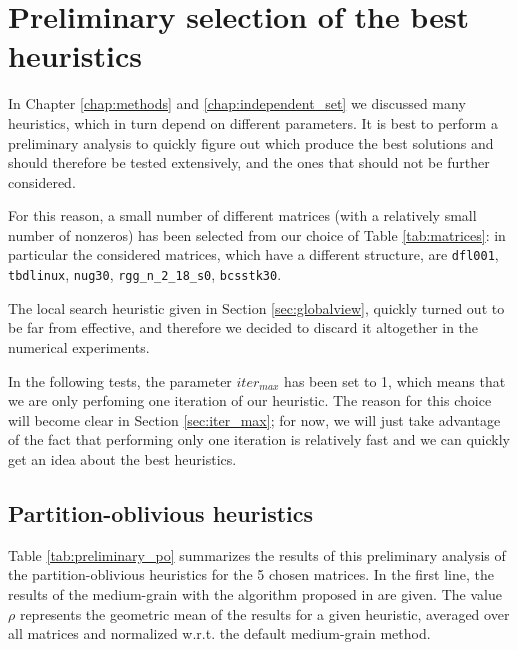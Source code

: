 \section{Preliminary selection of the best heuristics} \label{sec:preliminary_tests}

In Chapter \ref{chap:methods} and \ref{chap:independent_set} we discussed many heuristics, which in turn depend on different parameters. It is best to perform a preliminary analysis to quickly figure out which produce the best solutions and should therefore be tested extensively, and the ones that should not be further considered.

For this reason, a small number of different matrices (with a relatively small number of nonzeros) has been selected from our choice of Table \ref{tab:matrices}: in particular the considered matrices, which have a different structure, are \verb|dfl001|, \verb|tbdlinux|, \verb|nug30|, \verb|rgg_n_2_18_s0|, \verb|bcsstk30|.

The local search heuristic given in Section \ref{sec:globalview}, quickly turned out to be far from effective, and therefore we decided to discard it altogether in the numerical experiments.

In the following tests, the parameter $iter_{max}$ has been set to 1, which means that we are only perfoming one iteration of our heuristic. The reason for this choice will become clear in Section \ref{sec:iter_max}; for now, we will just take advantage of the fact that performing only one iteration is relatively fast and we can quickly get an idea about the best heuristics.

\subsection{Partition-oblivious heuristics} \label{sec:preliminary_po}

Table \ref{tab:preliminary_po} summarizes the results of this preliminary analysis of the partition-oblivious heuristics for the 5 chosen matrices. In the first line, the results of the medium-grain with the algorithm proposed in \cite{mediumgrain} are given. The value $\rho$ represents the geometric mean of the results for a given heuristic, averaged over all matrices and normalized w.r.t. the default medium-grain method.

